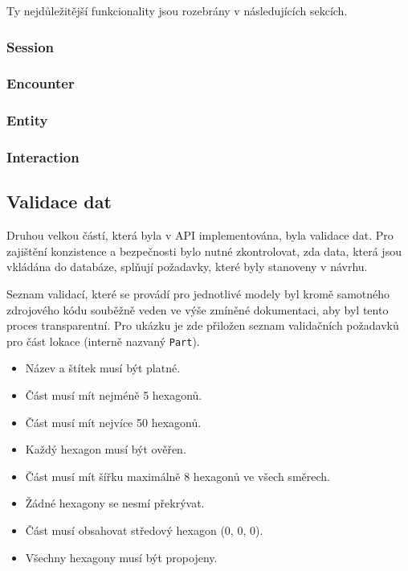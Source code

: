 Ty nejdůležitější funkcionality jsou rozebrány v následujících sekcích.

\subsubsection*{Session}
\label{subsubsec:impl_session}

\subsubsection*{Encounter}
\label{subsubsec:impl_encounter}

\subsubsection*{Entity}
\label{subsubsec:impl_entity}

\subsubsection*{Interaction}
\label{subsubsec:impl_interaction}

\subsection{Validace dat}
\label{subsec:validation}

Druhou velkou částí, která byla v API implementována, byla validace dat. Pro zajištění konzistence a bezpečnosti bylo nutné zkontrolovat, zda data, která jsou vkládána do databáze, splňují požadavky, které byly stanoveny v návrhu.

Seznam validací, které se provádí pro jednotlivé modely byl kromě samotného zdrojového kódu souběžně veden ve výše zmíněné dokumentaci, aby byl tento proces transparentní. Pro ukázku je zde přiložen seznam validačních požadavků pro část lokace (interně nazvaný \texttt{Part}).

\begin{itemize}
    \item Název a štítek musí být platné.
    \item Část musí mít nejméně 5 hexagonů.
    \item Část musí mít nejvíce 50 hexagonů.
    \item Každý hexagon musí být ověřen.
    \item Část musí mít šířku maximálně 8 hexagonů ve všech směrech.
    \item Žádné hexagony se nesmí překrývat.
    \item Část musí obsahovat středový hexagon (0, 0, 0).
    \item Všechny hexagony musí být propojeny.
\end{itemize}

